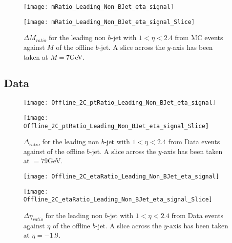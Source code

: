 	\begin{figure}[h]
		\centering

		\begin{minipage}[h]{0.33\linewidth}
			\texttt{[image: mRatio\_Leading\_Non\_BJet\_eta\_signal]}
		\end{minipage}
		\quad
		\begin{minipage}[h]{0.33\linewidth}
			\texttt{[image: mRatio\_Leading\_Non\_BJet\_eta\_signal\_Slice]}
		\end{minipage}
		\caption{$\Delta M_{ratio}$ for the leading \pt non $b$-jet with $1 < \eta < 2.4$ from MC events against $M$ of the offline $b$-jet. A slice across the $y$-axis has been taken at $M=7$GeV. }
		\label{fig:MC:leadingnonbmcore}
	\end{figure}
	
	\newpage
	\subsection{Data}
	
		\begin{figure}[h]
			\centering
			\begin{minipage}[h]{0.33\linewidth}
				\texttt{[image: Offline\_2C\_ptRatio\_Leading\_Non\_BJet\_eta\_signal]}
				
			\end{minipage}
			\quad
			\begin{minipage}[h]{0.33\linewidth}
				\texttt{[image: Offline\_2C\_ptRatio\_Leading\_Non\_BJet\_eta\_signal\_Slice]}
			\end{minipage}
			\caption{$\Delta $\pt$_{ratio}$ for the leading \pt non $b$-jet with $1 < \eta < 2.4$ from Data events against \pt of the offline $b$-jet. A slice across the $y$-axis has been taken at \pt$=79$GeV. }
			\label{fig:D:leadingnonbptcore}
		\end{figure}
		
		\begin{figure}[h]
			\centering
			
			\begin{minipage}[h]{0.33\linewidth}
				\texttt{[image: Offline\_2C\_etaRatio\_Leading\_Non\_BJet\_eta\_signal]}
			\end{minipage}
			\quad
			\begin{minipage}[h]{0.33\linewidth}
				\texttt{[image: Offline\_2C\_etaRatio\_Leading\_Non\_BJet\_eta\_signal\_Slice]}
			\end{minipage}
			\caption{$\Delta \eta_{ratio}$ for the leading \pt non $b$-jet with $1 < \eta < 2.4$ from Data events against $\eta$ of the offline $b$-jet. A slice across the $y$-axis has been taken at $\eta=-1.9$. }
			\label{fig:D:leadingnonbetacore}
		\end{figure}
		
